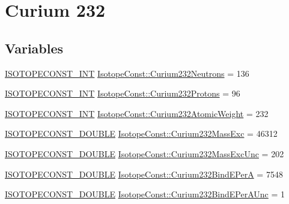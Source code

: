 \hypertarget{group___isotope_const-_curium-_cm232}{}\section{Curium 232}
\label{group___isotope_const-_curium-_cm232}
\subsection*{Variables}
\begin{DoxyCompactItemize}
\item 
\mbox{\hyperlink{group___isotope_const-_macros_ga5f18360b3e99483a35c32d789e62621c}{I\+S\+O\+T\+O\+P\+E\+C\+O\+N\+S\+T\+\_\+\+I\+NT}} \mbox{\hyperlink{group___isotope_const-_curium-_cm232_ga78a8c2f95c1820c804e9bca0d734710e}{Isotope\+Const\+::\+Curium232\+Neutrons}} = 136
\item 
\mbox{\hyperlink{group___isotope_const-_macros_ga5f18360b3e99483a35c32d789e62621c}{I\+S\+O\+T\+O\+P\+E\+C\+O\+N\+S\+T\+\_\+\+I\+NT}} \mbox{\hyperlink{group___isotope_const-_curium-_cm232_ga89a0fefb7058c30d709d478df34c3a90}{Isotope\+Const\+::\+Curium232\+Protons}} = 96
\item 
\mbox{\hyperlink{group___isotope_const-_macros_ga5f18360b3e99483a35c32d789e62621c}{I\+S\+O\+T\+O\+P\+E\+C\+O\+N\+S\+T\+\_\+\+I\+NT}} \mbox{\hyperlink{group___isotope_const-_curium-_cm232_gad80d46ba5da46e20267a2871eb53a70d}{Isotope\+Const\+::\+Curium232\+Atomic\+Weight}} = 232
\item 
\mbox{\hyperlink{group___isotope_const-_macros_ga8f45a7272ce02c0b4c65c44636ed719a}{I\+S\+O\+T\+O\+P\+E\+C\+O\+N\+S\+T\+\_\+\+D\+O\+U\+B\+LE}} \mbox{\hyperlink{group___isotope_const-_curium-_cm232_ga60dbeeeb55f19dbd9b783d019746ec6f}{Isotope\+Const\+::\+Curium232\+Mass\+Exc}} = 46312
\item 
\mbox{\hyperlink{group___isotope_const-_macros_ga8f45a7272ce02c0b4c65c44636ed719a}{I\+S\+O\+T\+O\+P\+E\+C\+O\+N\+S\+T\+\_\+\+D\+O\+U\+B\+LE}} \mbox{\hyperlink{group___isotope_const-_curium-_cm232_ga74bc55f9cbb1bdb631825dd917acdafd}{Isotope\+Const\+::\+Curium232\+Mass\+Exc\+Unc}} = 202
\item 
\mbox{\hyperlink{group___isotope_const-_macros_ga8f45a7272ce02c0b4c65c44636ed719a}{I\+S\+O\+T\+O\+P\+E\+C\+O\+N\+S\+T\+\_\+\+D\+O\+U\+B\+LE}} \mbox{\hyperlink{group___isotope_const-_curium-_cm232_gab1b8206d21b803e69ac57dd0b68a6e4e}{Isotope\+Const\+::\+Curium232\+Bind\+E\+PerA}} = 7548
\item 
\mbox{\hyperlink{group___isotope_const-_macros_ga8f45a7272ce02c0b4c65c44636ed719a}{I\+S\+O\+T\+O\+P\+E\+C\+O\+N\+S\+T\+\_\+\+D\+O\+U\+B\+LE}} \mbox{\hyperlink{group___isotope_const-_curium-_cm232_gafc771b471f9f57715c42cb1585d62d46}{Isotope\+Const\+::\+Curium232\+Bind\+E\+Per\+A\+Unc}} = 1

\end{DoxyCompactItemize}
